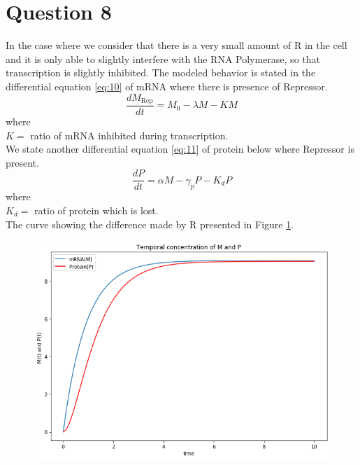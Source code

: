 \documentclass[12pt,a4paper]{article}
\begin{document}
\section*{Question 8}
In the case where we consider that there is a very small amount of R in the cell and it is only able to slightly
interfere with the RNA Polymerase,  so that transcription is slightly inhibited.   The modeled behavior is stated in the  differential equation \eqref{eq:10} of mRNA where there is presence of Repressor. 
\begin{equation}
\frac{dM_{\text{Rep}}}{dt} = M_0 -   \lambda M - KM     
\label{eq:10}
\end{equation}
where\\
$K= $ ratio of mRNA inhibited during transcription.\\
We state another  differential equation  \eqref{eq:11} of protein below where Repressor is present.
\begin{equation}
\frac{dP}{dt} = \alpha M - \gamma_p P - K_d P 
 \label{eq:11}
\end{equation}
where\\
 $K_d = $ ratio of protein which is lost. \\ 
The curve showing the difference made by R presented in Figure \ref{fig:8}.
\begin{figure}[H]
\centering
\includegraphics[scale=0.5]{./gaphics/q_8.png}
\caption{ }
\label{fig:8}
\end{figure}
\end{document}
